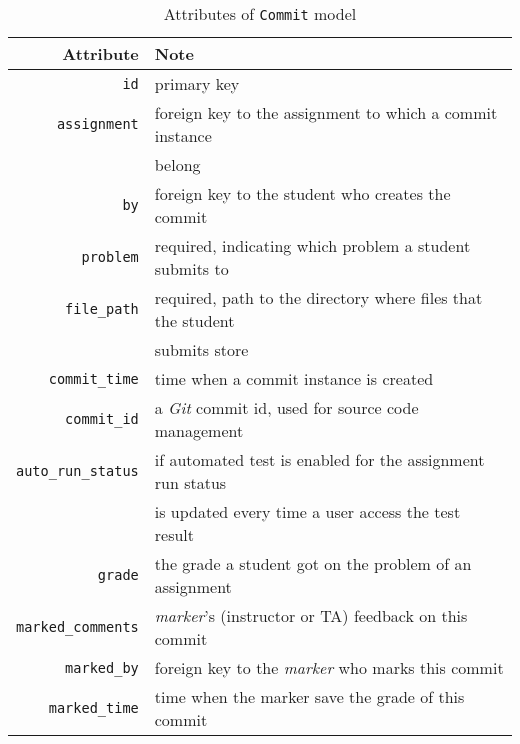 \begin{table}[H]
    \centering
    \caption{Attributes of \texttt{Commit} model}
    \label{tab:COMMIT_ATTR}
    \renewcommand{\arraystretch}{1.3}
    \begin{tabular}[H]{r|l}
        \hline
        Attribute & Note \\
        \hline
        \hline

        \texttt{id} & primary key \\
        \hline
        \texttt{assignment} & foreign key to the assignment to which a commit
            instance\\ & belong \\
        \hline
        \texttt{by} & foreign key to the student who creates the commit \\
        \hline
        \hline

        \texttt{problem} & required, indicating which problem a student submits
            to \\
        \hline
        \texttt{file\_path} & required, path to the directory where files that
            the student \\ & submits store \\
        \hline
        \texttt{commit\_time} & time when a commit instance is created \\
        \hline
        \texttt{commit\_id} & a \emph{Git} commit id, used for source code 
            management \\
        \hline
        \texttt{auto\_run\_status} & if automated test is enabled for the
            assignment 
            run status \\ & is updated every time a user access the test result \\
        \hline
        \hline

        \texttt{grade} & the grade a student got on the problem of an assignment \\
        \hline
        \texttt{marked\_comments} & \emph{marker}'s (instructor or TA) feedback on
            this commit \\
        \texttt{marked\_by} & foreign key to the \emph{marker} who marks this commit \\
        \hline
        \texttt{marked\_time} & time when the marker save the grade of this commit \\
        \hline
    \end{tabular}
    \renewcommand{\arraystretch}{1}
\end{table}


